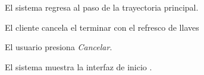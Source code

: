 {\begin{trayectoriaAlternativa}
    \item El sistema regresa al paso  de la trayectoria
      principal.

  \end{trayectoriaAlternativa}


  \begin{trayectoriaAlternativa}
    {El cliente cancela el terminar con el refresco de llaves}

    \item El usuario presiona \textit{Cancelar}.

    \item El sistema muestra la interfaz de inicio
      .

  \end{trayectoriaAlternativa}
}
